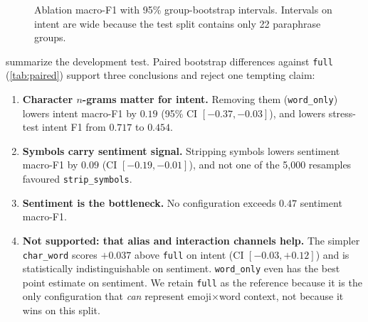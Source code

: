 \documentclass[11pt,a4paper]{article}
\theoremstyle{remark}
\newcommand{\lbl}[1]{\texttt{#1}}                      %
\begin{document}
\begin{figure}[t]
\centering
{}
\caption{Ablation macro-F1 with 95\% group-bootstrap intervals. Intervals on
intent are wide because the test split contains only 22 paraphrase groups.}
\label{fig:ablation}
\end{figure}

 summarize the development test. Paired
bootstrap differences against \lbl{full} (\cref{tab:paired}) support three
conclusions and reject one tempting claim:

\begin{enumerate}
  \item \textbf{Character $n$-grams matter for intent.} Removing them
        (\lbl{word\_only}) lowers intent macro-F1 by $0.19$ (95\% CI
        $[-0.37,-0.03]$), and lowers stress-test intent F1 from
        $0.717$ to $0.454$.
  \item \textbf{Symbols carry sentiment signal.} Stripping symbols lowers
        sentiment macro-F1 by $0.09$ (CI $[-0.19,-0.01]$), and
        not one of the 5{,}000 resamples favoured \lbl{strip\_symbols}.
  \item \textbf{Sentiment is the bottleneck.} No configuration exceeds
        $0.47$ sentiment macro-F1.
  \item \textbf{Not supported: that alias and interaction channels help.}
        The simpler \lbl{char\_word} scores $+0.037$ above \lbl{full} on
        intent (CI $[-0.03,+0.12]$) and is statistically indistinguishable
        on sentiment. \lbl{word\_only} even has the best point estimate on
        sentiment. We retain \lbl{full} as the reference because it is the only
        configuration that \emph{can} represent emoji$\times$word context, not
        because it wins on this split.
\end{enumerate}
\end{document}

